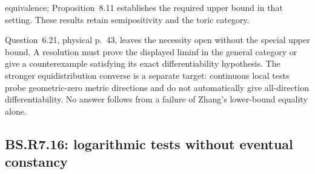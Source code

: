 \documentclass[11pt,a4paper]{article}
\theoremstyle{definition}
\theoremstyle{remark}
\begin{document}
\begin{description}
equivalence; Proposition~8.11 establishes the required upper bound in
that setting. These results retain semipositivity and the toric category.
\item[Residual scope and a successful outcome.]
Question~6.21, physical p.~43, leaves the necessity open without the
special upper bound. A resolution must prove the displayed liminf in
the general category or give a counterexample satisfying its exact
differentiability hypothesis. The stronger equidistribution converse is
a separate target: continuous local tests probe geometric-zero metric
directions and do not automatically give all-direction differentiability.
No answer follows from a failure of Zhang's lower-bound equality alone.
\end{description}

\subsection*{BS.R7.16: logarithmic tests without eventual constancy}
\label{supp:BS-R716}
\end{document}
